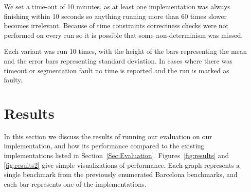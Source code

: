 \documentclass[sigconf]{acmart}
\begin{document}
We set a time-out of 10 minutes, as at least one implementation was always
finishing within 10 seconds so anything running more than 60 times slower becomes
irrelevant.  Because of time constraints correctness checks were not performed on
every run so it is possible that some non-determinism was missed. 

Each variant was run 10 times, with the height of the bars representing the
mean and the error bars representing standard deviation. In cases where there
was timeout or segmentation fault no time is reported and the run is marked
as faulty.

\section{Results} \label{Sec:Results}

In this section we discuss the results of running our evaluation on our
implementation, and how its performance compared to the existing
implementations listed in Section~\ref{Sec:Evaluation}. 
Figures~\ref{fig:results} and \ref{fig:results2} give simple visualizations of
performance. Each graph represents a single benchmark from the previously
enumerated Barcelona benchmarks, and each bar represents one of the
implementations.
\end{document}
